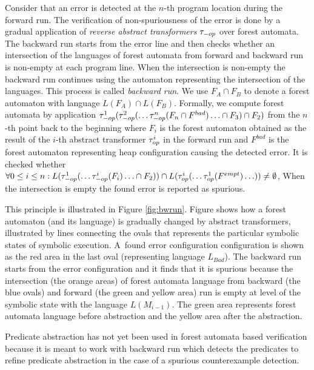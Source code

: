 Consider that an error is detected at the $n$-th program location
during the forward run.
The verification of non-spuriousness of the error is done by a gradual application of
\emph{reverse abstract transformers} $\tau_{-op}$ over forest automata.
The backward run starts from the error line and
then checks whether an intersection of
the languages of forest automata from forward and backward run is non-empty
at each program line.
When the intersection is non-empty the backward run continues using the automaton
representing the intersection of the languages.
This process is called \emph{backward run}.
We use $F_A \cap F_B$ to denote a forest automaton with language $L(F_A) \cap L(F_B)$.
Formally, we compute forest automata by application
$\tau_{-op}^1(\tau_{-op}^{2}(\ldots \tau_{-op}^{n}(F_{n} \cap F^{bad}) \ldots \cap F_{3}) \cap F_{2})$
from the $n$-th point back to the beginning
where $F_i$ is the forest automaton obtained as the result of 
the $i$-th abstract transformer $\tau_{op}^{i}$ in the forward run
and $F^{bad}$ is the forest automaton representing heap configuration causing the detected error.
It is checked whether $\forall 0 \leq i \leq n: L(\tau_{-op}^1(\ldots \tau_{-op}^{i}(F_{i}) \ldots \cap F_2)) \cap
L(\tau_{op}^i(\ldots \tau_{op}^{1}(F^{empt}) \ldots)) \neq \emptyset$,
When the intersection is empty the found error is reported as spurious.

This principle is illustrated in Figure \ref{fig:bwrun}.
Figure shows how a forest automaton (and its language) is gradually changed
by abstract transformers, illustrated by lines connecting the ovals
that represents the particular symbolic states of symbolic execution.
A~found error configuration configuration is shown
as the red area in the last oval (representing language $L_{\mathit{Bad}}$).
The backward run starts from the error configuration and it finds
that it is spurious because the intersection (the orange areas) of
forest automata language from backward (the blue ovals) and forward
(the green and yellow area) run is empty at level of the symbolic state
with the language $L(M_{i-1})$.
The green area represents forest automata language before abstraction
and the yellow area after the abstraction.

Predicate abstraction has not yet been used in forest automata based verification
because it is meant to work with backward run
which detects the predicates to refine predicate abstraction
in the case of a spurious counterexample detection.

